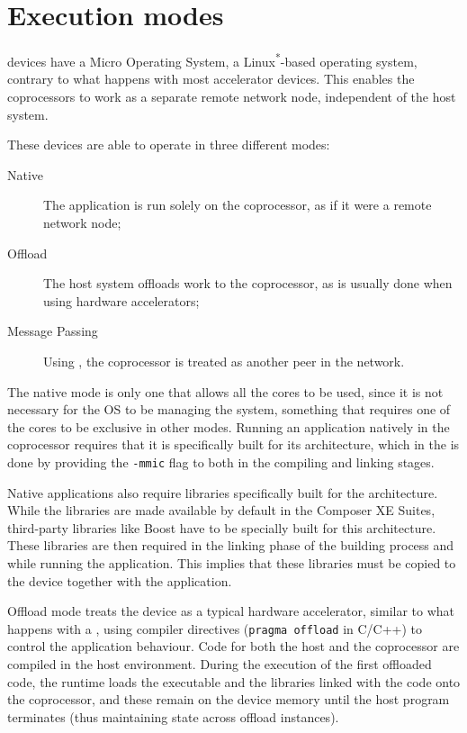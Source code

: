 \documentclass[../thesis]{subfiles}
\begin{document}
	\section{Execution modes}
	\label{sec:mic:modes}

	\intel\mic devices have a Micro Operating System, a Linux\textsuperscript{*}-based operating system, contrary to what happens with most accelerator devices. This enables the coprocessors to work as a separate remote network node, independent of the host system.

	These devices are able to operate in three different modes:
		\begin{description}
			\item [Native] The application is run solely on the coprocessor, as if it were a remote network node;
			\item [Offload] The host system offloads work to the coprocessor, as is usually done when using hardware accelerators;
			\item [Message Passing] Using \mpi, the coprocessor is treated as another peer in the network.
		\end{description}

	The native mode is only one that allows all the cores to be used, since it is not necessary for the OS to be managing the system, something that requires one of the cores to be exclusive in other modes. Running an application natively in the coprocessor requires that it is specifically built for its architecture, which in the \icc is done by providing the \texttt{-mmic} flag to both in the compiling and linking stages.

	Native applications also require libraries specifically built for the \intel\mic architecture. While the \intel libraries are made available by default in the \intel Composer XE Suites, third-party libraries like Boost have to be specially built for this architecture. These libraries are then required in the linking phase of the building process and while running the application. This implies that these libraries must be copied to the device together with the application. 

	Offload mode treats the device as a typical hardware accelerator, similar to what happens with a \gpu, using compiler directives (\texttt{pragma offload} in C/C++) to control the application behaviour. Code for both the host and the coprocessor are compiled in the host environment. During the execution of the first offloaded code, the runtime loads the executable and the libraries linked with the code onto the coprocessor, and these remain on the device memory until the host program terminates (thus maintaining state across offload instances).
\end{document}
